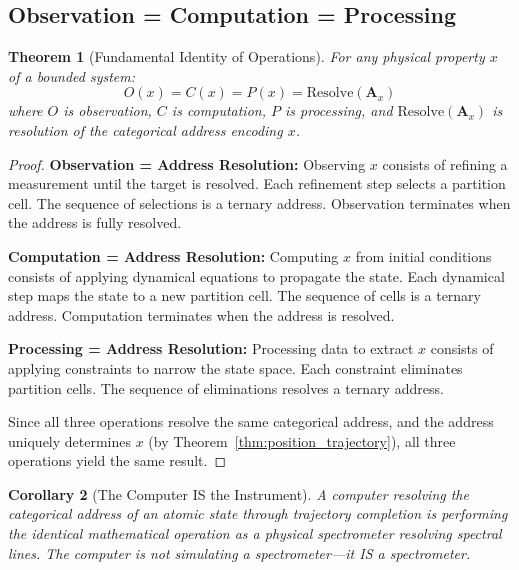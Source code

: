 \documentclass[11pt,a4paper]{article}
\newtheorem{theorem}{Theorem}[section]
\newtheorem{corollary}[theorem]{Corollary}
\theoremstyle{definition}
\theoremstyle{remark}
\begin{document}
\subsection{Observation = Computation = Processing}

\begin{theorem}[Fundamental Identity of Operations]
\label{thm:ocp}
For any physical property $x$ of a bounded system:
\begin{equation}
O(x) = C(x) = P(x) = \mathrm{Resolve}(\mathbf{A}_x)
\end{equation}
where $O$ is observation, $C$ is computation, $P$ is processing, and $\mathrm{Resolve}(\mathbf{A}_x)$ is resolution of the categorical address encoding $x$.
\end{theorem}

\begin{proof}
\textbf{Observation = Address Resolution:} Observing $x$ consists of refining a measurement until the target is resolved. Each refinement step selects a partition cell. The sequence of selections is a ternary address. Observation terminates when the address is fully resolved.

\textbf{Computation = Address Resolution:} Computing $x$ from initial conditions consists of applying dynamical equations to propagate the state. Each dynamical step maps the state to a new partition cell. The sequence of cells is a ternary address. Computation terminates when the address is resolved.

\textbf{Processing = Address Resolution:} Processing data to extract $x$ consists of applying constraints to narrow the state space. Each constraint eliminates partition cells. The sequence of eliminations resolves a ternary address.

Since all three operations resolve the same categorical address, and the address uniquely determines $x$ (by Theorem~\ref{thm:position_trajectory}), all three operations yield the same result.
\end{proof}

\begin{corollary}[The Computer IS the Instrument]
A computer resolving the categorical address of an atomic state through trajectory completion is performing the identical mathematical operation as a physical spectrometer resolving spectral lines. The computer is not simulating a spectrometer---it IS a spectrometer.
\end{corollary}

\end{document}
